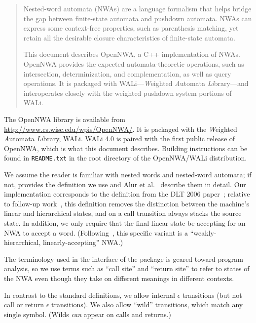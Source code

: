 \begin{abstract}

Nested-word automata (NWAs) are a language formalism that helps bridge
the gap between finite-state automata and pushdown automata. NWAs can express
some context-free properties, such as parenthesis matching, yet retain all
the desirable closure characteristics of finite-state automata.

This document describes OpenNWA, a C++ implementation of NWAs.  OpenNWA
provides the expected automata-theoretic operations, such as intersection,
determinization, and complementation, as well as query operations. It is
packaged with WALi---\textit{W}eighted \textit{A}utomata
\textit{Li}brary---and interoperates closely with the weighted pushdown
system portions of WALi.


\end{abstract}


The OpenNWA library is available from
\url{http://www.cs.wisc.edu/wpis/OpenNWA/}. It is packaged with the
\textit{W}eighted \textit{A}utomata \textit{Li}brary, WALi. WALi 4.0 is
paired with the first public release of OpenNWA, which is what this document
describes. Building instructions can be found in \texttt{README.txt} in the
root directory of the OpenNWA/WALi distribution.

We assume the reader is familiar with nested words and
nested-word automata; if not,  provides the definition
we use and
Alur et al.~\cite{DLT:AM2006,JACM:AM2009} describe them in detail. Our
implementation corresponds to the definition from the DLT 2006
paper~\cite{DLT:AM2006}; relative to follow-up work~\cite{JACM:AM2009}, this definition removes
the distinction between the machine's linear and hierarchical states, and on
a call transition always stacks the source state. In addition, we only require that the
final linear state be accepting for an NWA to accept a
word. (Following~\cite{JACM:AM2009}, this specific variant is a
``weakly-hierarchical, linearly-accepting'' NWA.)

The terminology used in the interface of the package is geared
toward program analysis, so we use terms such as ``call site'' and ``return
site'' to refer to states of the NWA even though they take on different
meanings in different contexts.

In contrast to the standard definitions, we allow internal $\epsilon$
transitions (but not call or return $\epsilon$ transitions). We also allow ``wild''
transitions, which match any single symbol. (Wilds \emph{can} appear on calls
and returns.)

